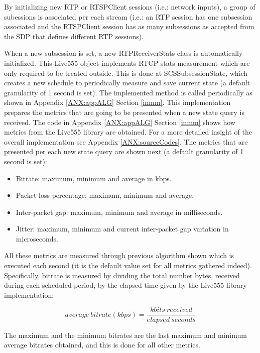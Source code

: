 By initializing new RTP or RTSPClient sessions (i.e.: network inputs), a group of subessions is associated per each stream (i.e.: an RTP session has one subsession associated and the RTSPClient session has as many subsessions as accepted from the SDP that defines different RTP sessions).

When a new subsession is set, a new RTPReceiverStats class is automatically initialized. This Live555 object implements RTCP stats measurement which are only required to be treated outside. This is done at SCSSubsessionState, which creates a new schedule to periodically measure and save current state (a default granularity of 1 second is set). The implemented method is called periodically as shown in Appendix \ref{ANX:appALG} Section \ref{inmm}. This implementation prepares the metrics that are going to be presented when a new state query is received. The code in Appendix \ref{ANX:appALG} Section \ref{inmm} shows how metrics from the Live555 library are obtained. For a more detailed insight of the overall implementation see Appendix \ref{ANX:sourceCodes}. The metrics that are presented per each new state query are shown next (a default granularity of 1 second is set):

\begin{itemize}
\item Bitrate: maximum, minimum and average in kbps.
\item Packet loss percentage: maximum, minimum and average.
\item Inter-packet gap: maximum, minimum and average in milliseconds.
\item Jitter: maximum, minimum and current inter-packet gap variation in microseconds.
\end{itemize}

All these metrics are measured through previous algorithm shown which is executed each second (it is the default value set for all metrics gathered indeed). Specifically, bitrate is measured by dividing the total number bytes, received during each scheduled period, by the elapsed time given by the Live555 library implementation:

\begin{equation}\label{E:bitrate}
average\ bitrate (kbps) = \frac{kbits\ received}{elapsed\ seconds}
\end{equation}

The maximum and the minimum bitrates are the last maximum and minimum average bitrates obtained, and this is done for all other metrics.

